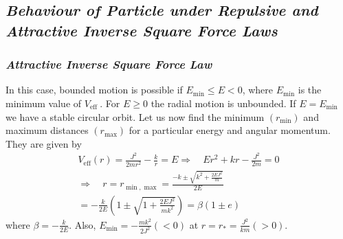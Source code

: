 \documentclass[conference]{IEEEtran}
\begin{document}
\subsection{\normalsize{\emph{\textbf{Behaviour of Particle under Repulsive and Attractive Inverse Square Force Laws}}}}

\subsubsection{\normalsize{\emph{\textbf{Attractive Inverse Square Force Law}}}}
In this case, bounded motion is possible if $E_{\min } \leq E<0$, where $E_{\min }$ is the minimum value of $V_{\text {eff }}$. For $E \geq 0$ the radial motion is unbounded. If $E=E_{\min }$ we have a stable circular orbit. Let us now find the minimum $(r_{\min})$ and maximum distances $(r_{\max})$ for a particular energy and
angular momentum. They are given by \begin{dmath}
\begin{array}{c}
V_{\mathrm{eff}}(r)=\frac{J^{2}}{2 m r^{2}}-\frac{k}{r}=E \Rightarrow \quad E r^{2}+k r-\frac{J^{2}}{2 m}=0 \\
\Rightarrow \quad r=r_{\min , \max }=\frac{-k \pm \sqrt{k^{2}+\frac{2 E J^{2}}{m}}}{2 E} \\
=-\frac{k}{2 E}\left(1 \pm \sqrt{1+\frac{2 E J^{2}}{m k^{2}}}\right) =\beta(1 \pm e)
\end{array}
\end{dmath} where $\beta=-\frac{k}{2 E}$. Also, $E_{\min }=-\frac{mk^{2}}{2 J^{2}}(<0)$ at $r = r_{*} = \frac{J^{2}}{km}(>0)$. 
\vspace{1em}
\end{document}

